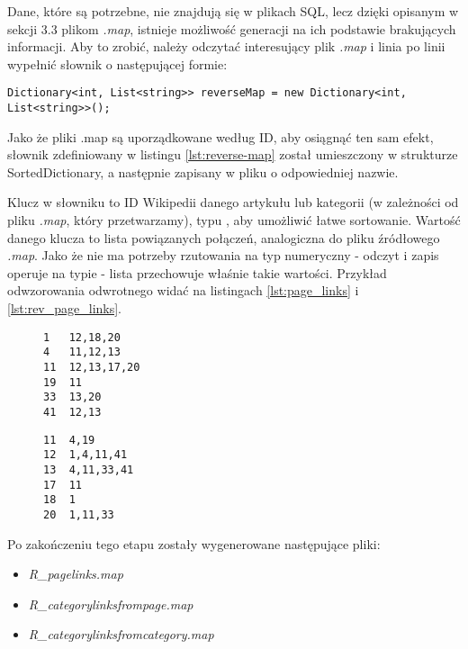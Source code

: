 Dane, które są potrzebne, nie znajdują się w plikach SQL, lecz dzięki opisanym w sekcji 3.3 plikom \textit{.map}, istnieje możliwość generacji na ich podstawie brakujących informacji. Aby to zrobić, należy odczytać interesujący plik \textit{.map} i linia po linii wypełnić słownik o następującej formie:

\begin{lstlisting}[caption={Słownik przechowujący odwzorowanie odwrotne}, label=lst:reverse-map]
Dictionary<int, List<string>> reverseMap = new Dictionary<int, List<string>>();
\end{lstlisting}

Jako że pliki .map są uporządkowane według ID, aby osiągnąć ten sam efekt, słownik zdefiniowany w listingu \ref{lst:reverse-map} został umieszczony w strukturze SortedDictionary, a następnie zapisany w pliku o odpowiedniej nazwie. 

Klucz w słowniku to ID Wikipedii danego artykułu lub kategorii (w zależności od pliku \textit{.map}, który przetwarzamy), typu , aby umożliwić łatwe sortowanie. Wartość danego klucza to lista powiązanych połączeń, analogiczna do pliku źródłowego \textit{.map}. Jako że nie ma potrzeby rzutowania na typ numeryczny - odczyt i zapis operuje na typie  - lista przechowuje właśnie takie wartości. Przykład odwzorowania odwrotnego widać na listingach \ref{lst:page_links} i \ref{lst:rev_page_links}.

\begin{figure}[!h]
\begin{center}
    \begin{minipage}[c]{0.45\linewidth}
        \begin{lstlisting}[frame=single,caption={Przykładowy fragment pliku pagelinks.map},label=lst:page_links]
1   12,18,20
4   11,12,13
11  12,13,17,20
19  11
33  13,20
41  12,13
\end{lstlisting}
    \end{minipage}
    \hspace{1em}
    \begin{minipage}[c]{0.45\linewidth}
        \begin{lstlisting}[frame=single,caption={Odwzorowanie odwrotne z listingu \ref{lst:page_links} (fragment R\_pagelinks.map)},label=lst:rev_page_links]
11  4,19
12  1,4,11,41
13  4,11,33,41
17  11
18  1
20  1,11,33
\end{lstlisting}
\end{minipage}
\end{center}
\end{figure}
Po zakończeniu tego etapu zostały wygenerowane następujące pliki:
\begin{itemize}
    \item \textit{R\_pagelinks.map}
    \item \textit{R\_categorylinksfrompage.map}
    \item \textit{R\_categorylinksfromcategory.map}
\end{itemize}

